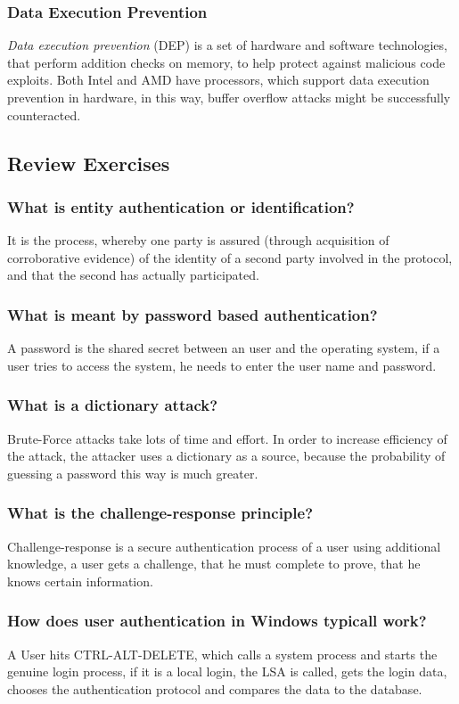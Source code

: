 \documentclass[a4paper, 10 pt, conference]{ieeeconf}
\begin{document}
\subsubsection{\textbf{Data Execution Prevention}}
\emph{Data execution prevention} (DEP) is a set of hardware and software technologies, that perform addition checks on memory, to help protect against malicious code exploits. Both Intel and AMD have processors, which support data execution prevention in hardware, in this way, buffer overflow attacks might be successfully counteracted. 






\subsection{\textbf{Review Exercises}}

\subsubsection{\textbf{What is entity authentication or identification?}}
It is the process, whereby one party is assured (through acquisition of corroborative evidence) of the identity of a second party involved in the protocol, and that the second has actually participated.
\subsubsection{\textbf{What is meant by password based authentication?}}
A password is the shared secret between an user and the operating system, if a user tries to access the system, he needs to enter the user name and password. 
\subsubsection{\textbf{What is a dictionary attack?}}
Brute-Force attacks take lots of time and effort. In order to increase efficiency of the attack, the attacker uses a dictionary as a source, because the probability of guessing a password this way is much greater. 
\subsubsection{\textbf{What is the challenge-response principle?}}
Challenge-response is a secure authentication process of a user using additional knowledge, a user gets a challenge, that he must complete to prove, that he knows certain information. 
\subsubsection{\textbf{How does user authentication in Windows typicall work?}}
A User hits CTRL-ALT-DELETE, which calls a system process and starts the genuine login process, if it is a local login, the LSA is called, gets the login data, chooses the authentication protocol and compares the data to the database. 
\end{document}
